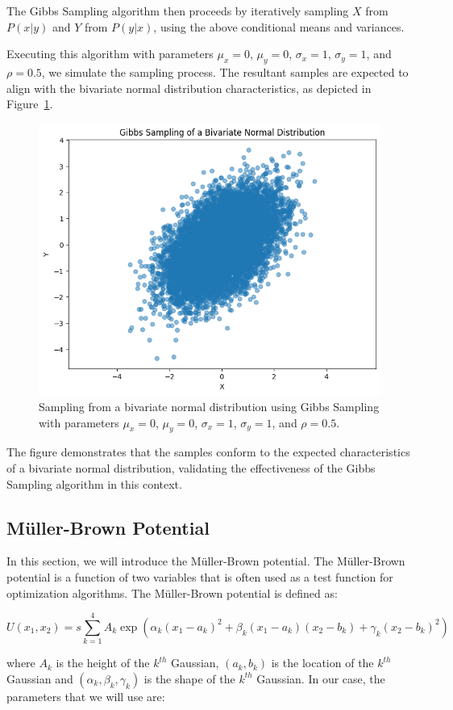 \documentclass{report}
\begin{document}
The Gibbs Sampling algorithm then proceeds by iteratively sampling \( X \) from \( P(x | y) \) and \( Y \) from \( P(y | x) \), using the above conditional means and variances.

Executing this algorithm with parameters \( \mu_x = 0 \), \( \mu_y = 0 \), \( \sigma_x = 1 \), \( \sigma_y = 1 \), and \( \rho = 0.5 \), we simulate the sampling process. The resultant samples are expected to align with the bivariate normal distribution characteristics, as depicted in Figure~\ref{fig:bivariatenormal2}.


\begin{figure}[H]
	\centering
	\includegraphics[width=0.5\linewidth]{./Figures/MCMC/bivariates.png}
	\caption{Sampling from a bivariate normal distribution using Gibbs Sampling with parameters $\mu_x = 0$, $\mu_y = 0$, $\sigma_x = 1$, $\sigma_y = 1$, and $\rho = 0.5$.}
	\label{fig:bivariatenormal2}
\end{figure}

The figure demonstrates that the samples conform to the expected characteristics of a bivariate normal distribution, validating the effectiveness of the Gibbs Sampling algorithm in this context.

\subsection{Müller-Brown Potential}
\label{sec:muller_brown_potential}

In this section, we will introduce the Müller-Brown potential. The Müller-Brown potential is a function of two variables that is often used as a test function for optimization algorithms. The Müller-Brown potential is defined as:

\[
	U(x_1, x_2) = s \sum_{k=1}^4 A_k \exp(\alpha_k(x_1 - a_k)^2 + \beta_k(x_1 - a_k)(x_2 - b_k) + \gamma_k(x_2 - b_k)^2)
\]

where \(A_k\) is the height of the \(k^{th}\) Gaussian, \((a_k, b_k)\) is the location of the \(k^{th}\) Gaussian and \((\alpha_k, \beta_k, \gamma_k)\) is the shape of the \(k^{th}\) Gaussian. In our case, the parameters that we will use are:
\end{document}
